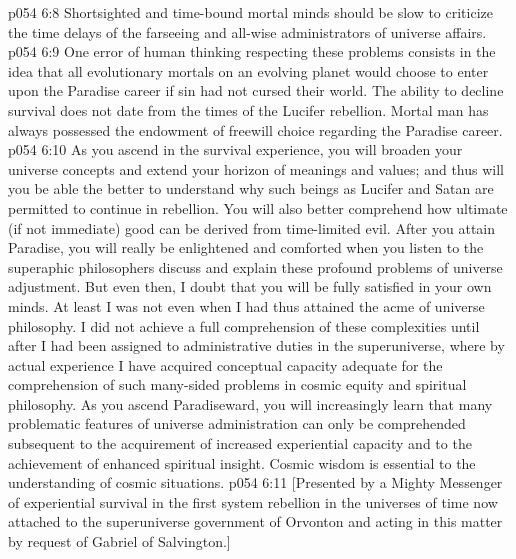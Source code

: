 \vs p054 6:8 Shortsighted and time\hyp{}bound mortal minds should be slow to criticize the time delays of the farseeing and all\hyp{}wise administrators of universe affairs.
\vs p054 6:9 One error of human thinking respecting these problems consists in the idea that all evolutionary mortals on an evolving planet would choose to enter upon the Paradise career if sin had not cursed their world. The ability to decline survival does not date from the times of the Lucifer rebellion. Mortal man has always possessed the endowment of freewill choice regarding the Paradise career.
\pc \vs p054 6:10 As you ascend in the survival experience, you will broaden your universe concepts and extend your horizon of meanings and values; and thus will you be able the better to understand why such beings as Lucifer and Satan are permitted to continue in rebellion. You will also better comprehend how ultimate (if not immediate) good can be derived from time\hyp{}limited evil. After you attain Paradise, you will really be enlightened and comforted when you listen to the superaphic philosophers discuss and explain these profound problems of universe adjustment. But even then, I doubt that you will be fully satisfied in your own minds. At least I was not even when I had thus attained the acme of universe philosophy. I did not achieve a full comprehension of these complexities until after I had been assigned to administrative duties in the superuniverse, where by actual experience I have acquired conceptual capacity adequate for the comprehension of such many\hyp{}sided problems in cosmic equity and spiritual philosophy. As you ascend Paradiseward, you will increasingly learn that many problematic features of universe administration can only be comprehended subsequent to the acquirement of increased experiential capacity and to the achievement of enhanced spiritual insight. Cosmic wisdom is essential to the understanding of cosmic situations.\plusone
\vsetoff
\vs p054 6:11 [Presented by a Mighty Messenger of experiential survival in the first system rebellion in the universes of time now attached to the superuniverse government of Orvonton and acting in this matter by request of Gabriel of Salvington.]
